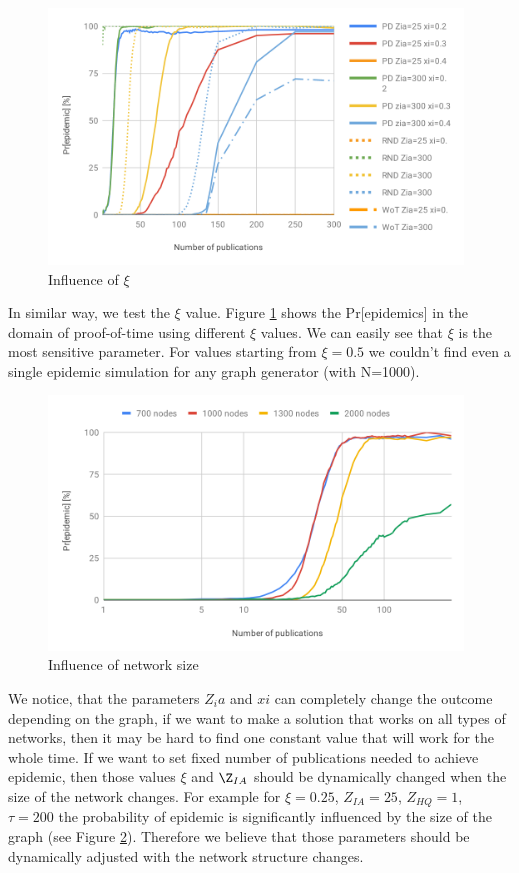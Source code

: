 \documentclass[nostrict]{szablonPG}
\begin{document}
\begin{figure}[h!]
    \includegraphics[width=11cm]{img/influence-of-xi.png}
    \centering
    \caption{Influence of $\xi$}
    \label{fig:influence-of-xi}
\end{figure} 
In similar way, we test the $\xi$ value. Figure \ref{fig:influence-of-xi} shows the Pr[epidemics] in the domain of proof-of-time using different $\xi$ values. We can easily see that $\xi$ is the most sensitive parameter. For values starting from $\xi=0.5$ we couldn't find even a single epidemic simulation for any graph generator (with N=1000).

\begin{figure}[h!]
    \includegraphics[width=11cm]{img/Influence-of-network-size.png}
    \centering
    \caption{Influence of network size}
    \label{fig:influence-network-size}
\end{figure} 
We notice, that the parameters $Z_ia$ and $xi$ can completely change the outcome depending on the graph, if we want to make a solution that works on all types of networks, then it may be hard to find one constant value that will work for the whole time. If we want to set fixed number of publications needed to achieve epidemic, then those values $\xi$ and $\Z_{IA}$ should be dynamically changed when the size of the network changes.
For example for $\xi=0.25$, $Z_{IA}=25$, $Z_{HQ}=1$, $\tau=200$ the probability of epidemic is significantly influenced by the size of the graph (see Figure \ref{fig:influence-network-size}). Therefore we believe that those parameters should be dynamically adjusted with the network structure changes.
\end{document}
